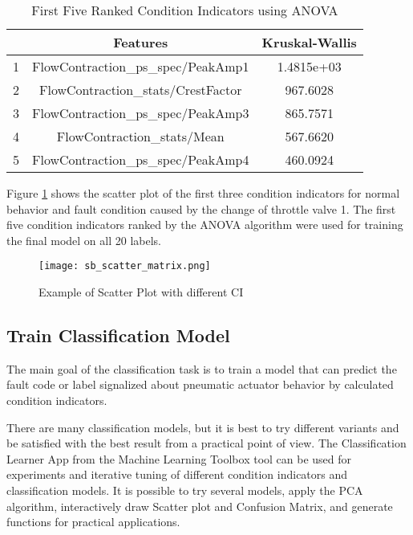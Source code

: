 \begin{table}[h]
        \centering
    \begin{tabular} {|c|c|c|} \hline
          & Features & Kruskal-Wallis \\ \hline
        1 & FlowContraction\_ps\_spec/PeakAmp1 & 1.4815e+03 \\ \hline
        2 & FlowContraction\_stats/CrestFactor & 967.6028 \\ \hline
        3 & FlowContraction\_ps\_spec/PeakAmp3 & 865.7571 \\ \hline
        4 & FlowContraction\_stats/Mean        & 567.6620 \\ \hline
        5 & FlowContraction\_ps\_spec/PeakAmp4 & 460.0924 \\ \hline
    \end{tabular}
    \caption{First Five Ranked Condition Indicators using ANOVA}
    \label{tab:sorted_ci}
\end{table}

Figure \ref{fig:sb_scatt_mat} shows the scatter plot of the first three condition
indicators for normal behavior and fault condition caused by the change of
throttle valve 1.
The first five condition indicators ranked by the ANOVA algorithm were used
for training the final model on all 20 labels.

\begin{figure}[h!]
    \centering
    \texttt{[image: sb\_scatter\_matrix.png]}
    \caption{Example of Scatter Plot with different CI}
    \label{fig:sb_scatt_mat}
\end{figure}


\subsection{Train Classification Model}
The main goal of the classification task is to train a model that can
predict the fault code or label signalized about pneumatic actuator
behavior by calculated condition indicators.

There are many classification models, but it is best to try different
variants and be satisfied with the best result from a practical point of
view.  The Classification Learner App from the Machine Learning Toolbox
tool can be used for experiments and iterative tuning of different
condition indicators and classification models. It is possible to try
several models, apply the PCA algorithm, interactively draw Scatter plot
and Confusion Matrix, and generate functions for practical applications.


